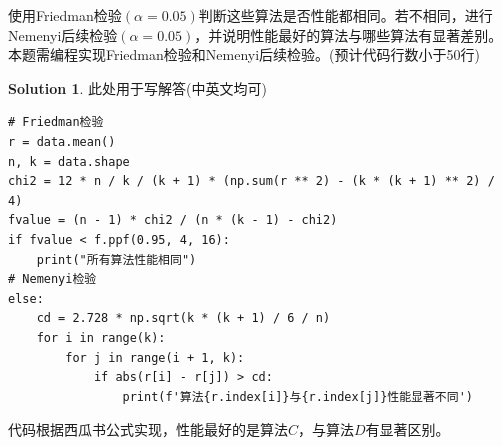 \documentclass[a4paper,UTF8]{article}
\theoremstyle{definition}
\newtheorem*{solution}{Solution}
\begin{document}
使用Friedman检验$(\alpha=0.05)$判断这些算法是否性能都相同。若不相同，进行Nemenyi后续检验$(\alpha=0.05)$，并说明性能最好的算法与哪些算法有显著差别。本题需编程实现Friedman检验和Nemenyi后续检验。(预计代码行数小于50行)
\begin{solution}
此处用于写解答(中英文均可)
\begin{verbatim}
# Friedman检验
r = data.mean()
n, k = data.shape
chi2 = 12 * n / k / (k + 1) * (np.sum(r ** 2) - (k * (k + 1) ** 2) / 4)
fvalue = (n - 1) * chi2 / (n * (k - 1) - chi2)
if fvalue < f.ppf(0.95, 4, 16):
    print("所有算法性能相同")
# Nemenyi检验
else:
    cd = 2.728 * np.sqrt(k * (k + 1) / 6 / n)
    for i in range(k):
        for j in range(i + 1, k):
            if abs(r[i] - r[j]) > cd:
                print(f'算法{r.index[i]}与{r.index[j]}性能显著不同')
\end{verbatim}
代码根据西瓜书公式实现，性能最好的是算法$C$，与算法$D$有显著区别。
\end{solution}
\end{document}
